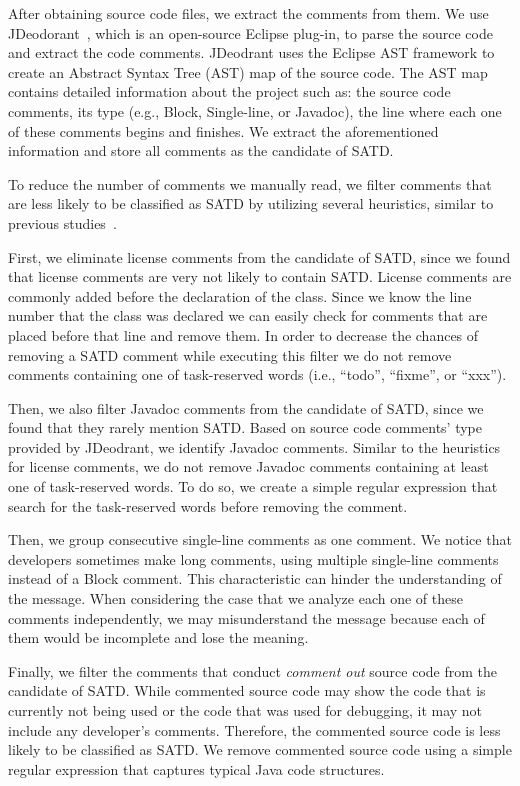 \documentclass[conference]{IEEEtran}
\begin{document}
After obtaining source code files, we extract the comments from them. We use JDeodorant~\cite{Tsantalis2008CSMR}, which is an open-source Eclipse plug-in, to parse the source code and extract the code comments. JDeodrant uses the Eclipse AST framework to create an Abstract Syntax Tree (AST) map of the source code. The AST map contains detailed information about the project such as: the source code comments, its type (e.g., Block, Single-line, or Javadoc), the line where each one of these comments begins and finishes. We extract the aforementioned information and store all comments as the candidate of SATD.

To reduce the number of comments we manually read, we filter comments that are less likely to be classified as SATD by utilizing several heuristics, similar to previous studies~\cite{Maldonado2015MTD}.

First, we eliminate license comments from the candidate of SATD, since we found that license comments are very not likely to contain SATD. License comments are commonly added before the declaration of the class. Since we know the line number that the class was declared we can easily check for comments that are placed before that line and remove them. In order to decrease the chances of removing a SATD comment while executing this filter we do not remove comments containing one of task-reserved words (i.e., “todo”, “fixme”, or “xxx”).

Then, we also filter Javadoc comments from the candidate of SATD, since we found that they rarely mention SATD. Based on source code comments' type provided by JDeodrant, we identify Javadoc comments. Similar to the heuristics for license comments, we do not remove Javadoc comments containing at least one of task-reserved words. To do so, we create a simple regular expression that search for the task-reserved words before removing the comment.

Then, we group consecutive single-line comments as one comment. We notice that developers sometimes make long comments, using multiple single-line comments instead of a Block comment. This characteristic can hinder the understanding of the message. When considering the case that we analyze each one of these comments independently, we may misunderstand the message because each of them would be incomplete and lose the meaning.

Finally, we filter the comments that conduct {\it comment out} source code from the candidate of SATD. While commented source code may show the code that is currently not being used or the code that was used for debugging, it may not include any developer's comments. Therefore, the commented source code is less likely to be classified as SATD. We remove commented source code using a simple regular expression that captures typical Java code structures.
\end{document}

